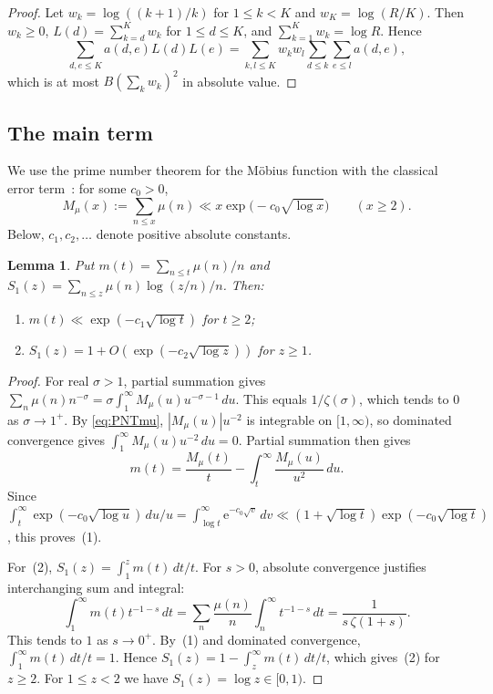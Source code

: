 \documentclass[11pt]{amsart}
\newtheorem{lemma}[theorem]{Lemma}
\theoremstyle{definition}
\theoremstyle{remark}
\numberwithin{equation}{section}
\newcommand{\e}{\mathrm e}
\begin{document}
\begin{proof}
Let $w_k=\log((k+1)/k)$ for $1\le k<K$ and $w_K=\log(R/K)$.  Then
$w_k\ge0$, $L(d)=\sum_{k=d}^Kw_k$ for $1\le d\le K$, and
$\sum_{k=1}^Kw_k=\log R$.  Hence
\[
 \sum_{d,e\le K}a(d,e)L(d)L(e)
 =\sum_{k,l\le K}w_kw_l\sum_{d\le k}\sum_{e\le l}a(d,e),
\]
which is at most $B(\sum_kw_k)^2$ in absolute value.
\end{proof}

\subsection{The main term}
We use the prime number theorem for the M\"obius function with the
classical error term~\cite[Ch.~6]{MV}: for some $c_0>0$,
\begin{equation}\label{eq:PNTmu}
 M_\mu(x):=\sum_{n\le x}\mu(n)\ll x\exp\bigl(-c_0\sqrt{\log x}\bigr)
 \qquad(x\ge2).
\end{equation}
Below, $c_1,c_2,\dots$ denote positive absolute constants.

\begin{lemma}\label{lem:S1}
Put $m(t)=\sum_{n\le t}\mu(n)/n$ and
$S_1(z)=\sum_{n\le z}\mu(n)\log(z/n)/n$.  Then:
\begin{enumerate}
\item $m(t)\ll\exp(-c_1\sqrt{\log t})$ for $t\ge2$;
\item $S_1(z)=1+O(\exp(-c_2\sqrt{\log z}))$ for $z\ge1$.
\end{enumerate}
\end{lemma}

\begin{proof}
For real $\sigma>1$, partial summation gives
$\sum_n\mu(n)n^{-\sigma}=\sigma\int_1^\infty M_\mu(u)u^{-\sigma-1}\,du$.
This equals $1/\zeta(\sigma)$, which tends to $0$ as $\sigma\to1^+$.  By
\eqref{eq:PNTmu}, $|M_\mu(u)|u^{-2}$ is integrable on $[1,\infty)$, so
dominated convergence gives $\int_1^\infty M_\mu(u)u^{-2}\,du=0$.  Partial
summation then gives
\[
 m(t)=\frac{M_\mu(t)}t-\int_t^\infty\frac{M_\mu(u)}{u^2}\,du .
\]
Since
$\int_t^\infty\exp(-c_0\sqrt{\log u})\,du/u=\int_{\log t}^\infty
\e^{-c_0\sqrt v}\,dv\ll(1+\sqrt{\log t})\exp(-c_0\sqrt{\log t})$, this
proves~(1).

For~(2), $S_1(z)=\int_1^zm(t)\,dt/t$.  For $s>0$, absolute convergence
justifies interchanging sum and integral:
\[
 \int_1^\infty m(t)t^{-1-s}\,dt
 =\sum_n\frac{\mu(n)}n\int_n^\infty t^{-1-s}\,dt
 =\frac1{s\,\zeta(1+s)} .
\]
This tends to $1$ as $s\to0^+$.  By~(1) and dominated convergence,
$\int_1^\infty m(t)\,dt/t=1$.  Hence
$S_1(z)=1-\int_z^\infty m(t)\,dt/t$, which gives~(2) for $z\ge2$.  For
$1\le z<2$ we have $S_1(z)=\log z\in[0,1)$.
\end{proof}
\end{document}
